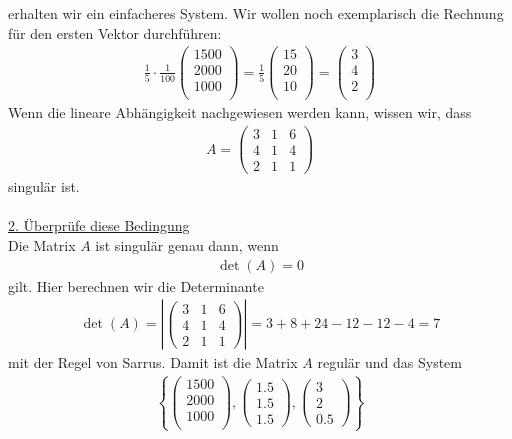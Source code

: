 erhalten wir ein einfacheres System.
Wir wollen noch exemplarisch die Rechnung für den ersten Vektor durchführen:
\begin{align*}
\frac{1}{5} \cdot \frac{1}{100}
\begin{pmatrix}
1500\\
2000\\
1000\\
\end{pmatrix}
=
\frac{1}{5}
\begin{pmatrix}
15\\
20\\
10\\
\end{pmatrix}
=
\begin{pmatrix}
3\\
4\\
2\\
\end{pmatrix}
\end{align*}
Wenn die lineare Abhängigkeit nachgewiesen werden kann, wissen wir, dass
\begin{align*}
A
= 
\begin{pmatrix}
3 & 1 & 6 \\
4 & 1 & 4 \\
2 & 1 & 1
\end{pmatrix}
\end{align*}
singulär ist.\\
\\
\underline{2. Überprüfe diese Bedingung}\\
Die Matrix $A$ ist singulär genau dann, wenn
\begin{align*}
\det(A) = 0
\end{align*}
gilt.
Hier berechnen wir die Determinante
\begin{equation*}
\begin{split}
\det(A)
=
\left|
\begin{pmatrix}
3 & 1 & 6 \\
4 & 1 & 4 \\
2 & 1 & 1
\end{pmatrix}
\right|
=
3 + 8 + 24 - 12 - 12 -4
= 
7
\end{split}
\end{equation*}
mit der Regel von Sarrus.
Damit ist die Matrix $A$ regulär und das System
\begin{align*}
\left\lbrace 
\begin{pmatrix}
1500\\
2000\\
1000\\
\end{pmatrix},
\begin{pmatrix}
1.5\\
1.5\\
1.5
\end{pmatrix},
\begin{pmatrix}
3\\
2\\ 
0.5
\end{pmatrix}
\right\rbrace
\end{align*}
